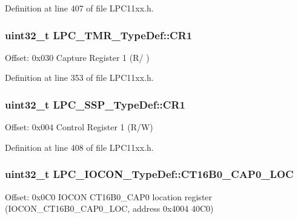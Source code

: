 Definition at line 407 of file L\+P\+C11xx.\+h.

\subsubsection[{\texorpdfstring{C\+R1}{CR1}}]{ uint32\+\_\+t L\+P\+C\+\_\+\+T\+M\+R\+\_\+\+Type\+Def\+::\+C\+R1}\hypertarget{group___l_p_c11xx___definitions_ga38ad1e04b125d455b3881f652cfe14c3}{}\label{group___l_p_c11xx___definitions_ga38ad1e04b125d455b3881f652cfe14c3}
Offset\+: 0x030 Capture Register 1 (R/ ) 

Definition at line 353 of file L\+P\+C11xx.\+h.

\subsubsection[{\texorpdfstring{C\+R1}{CR1}}]{ uint32\+\_\+t L\+P\+C\+\_\+\+S\+S\+P\+\_\+\+Type\+Def\+::\+C\+R1}\hypertarget{group___l_p_c11xx___definitions_ga016ea63a8c118f5b75a64a6e5f81c984}{}\label{group___l_p_c11xx___definitions_ga016ea63a8c118f5b75a64a6e5f81c984}
Offset\+: 0x004 Control Register 1 (R/W) 

Definition at line 408 of file L\+P\+C11xx.\+h.

\subsubsection[{\texorpdfstring{C\+T16\+B0\+\_\+\+C\+A\+P0\+\_\+\+L\+OC}{CT16B0_CAP0_LOC}}]{ uint32\+\_\+t L\+P\+C\+\_\+\+I\+O\+C\+O\+N\+\_\+\+Type\+Def\+::\+C\+T16\+B0\+\_\+\+C\+A\+P0\+\_\+\+L\+OC}\hypertarget{group___l_p_c11xx___definitions_ga665596a8d6cc6bd6f61485aba90d62c5}{}\label{group___l_p_c11xx___definitions_ga665596a8d6cc6bd6f61485aba90d62c5}
Offset\+: 0x0\+C0 I\+O\+C\+ON C\+T16\+B0\+\_\+\+C\+A\+P0 location register (I\+O\+C\+O\+N\+\_\+\+C\+T16\+B0\+\_\+\+C\+A\+P0\+\_\+\+L\+OC, address 0x4004 40\+C0) 

